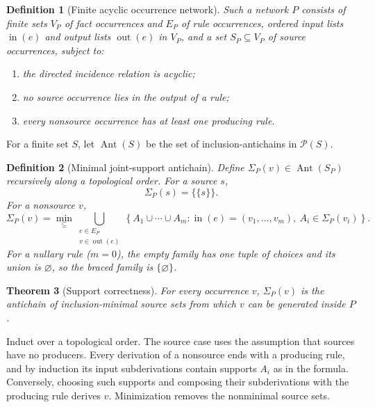 \documentclass[12pt,a4paper,twoside]{extarticle}
\makeatletter
\theoremstyle{compactplain}
\newtheorem{theorem}{Theorem}[section]
\theoremstyle{compactdef}
\newtheorem{definition}[theorem]{Definition}
\renewenvironment{proof}[1][\proofname]{\par\pushQED{\qed}\normalfont
  \topsep2pt\trivlist\item[\hskip\labelsep\bfseries #1\@addpunct{.}]\ignorespaces}
 {\popQED\endtrivlist\@endpefalse}
\newcommand{\minsub}{\min_{\subseteq}}
\makeatother
\begin{document}
\begin{definition}[Finite acyclic occurrence network]
Such a network $P$ consists of finite sets $V_P$ of fact occurrences and $E_P$ of rule occurrences, ordered input lists $\operatorname{in}(e)$ and output lists $\operatorname{out}(e)$ in $V_P$, and a set $S_P\subseteq V_P$ of source occurrences, subject to:
\begin{enumerate}
\item the directed incidence relation is acyclic;
\item no source occurrence lies in the output of a rule;
\item every nonsource occurrence has at least one producing rule.
\end{enumerate}
\end{definition}
For a finite set $S$, let $\operatorname{Ant}(S)$ be the set of inclusion-antichains in $\mathcal P(S)$.

\begin{definition}[Minimal joint-support antichain]
Define $\Sigma_P(v)\in\operatorname{Ant}(S_P)$ recursively along a topological order. For a source $s$,
\[
\Sigma_P(s)=\{\{s\}\}.
\]
For a nonsource $v$,
\[
\Sigma_P(v)=\minsub\bigcup_{\substack{e\in E_P\\v\in\operatorname{out}(e)}}
\left\{A_1\cup\cdots\cup A_m:
\operatorname{in}(e)=(v_1,\dots,v_m),\ A_i\in\Sigma_P(v_i)\right\}.
\]
For a nullary rule ($m=0$), the empty family has one tuple of choices and its union is $\varnothing$, so the braced family is $\{\varnothing\}$.
\end{definition}

\begin{theorem}[Support correctness]
For every occurrence $v$, $\Sigma_P(v)$ is the antichain of inclusion-minimal source sets from which $v$ can be generated inside $P$.
\end{theorem}
\begin{proof}
Induct over a topological order. The source case uses the assumption that sources have no producers. Every derivation of a nonsource ends with a producing rule, and by induction its input subderivations contain supports $A_i$ as in the formula. Conversely, choosing such supports and composing their subderivations with the producing rule derives $v$. Minimization removes the nonminimal source sets.
\end{proof}
\end{document}
